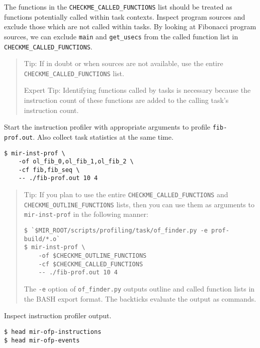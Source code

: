 \documentclass[11pt,a4paper]{article}
\begin{document}
The functions in the \texttt{CHECKME\_CALLED\_FUNCTIONS} list should be treated as functions potentially called within task contexts.  Inspect program sources and exclude those which are not called within tasks.  By looking at Fibonacci program sources, we can exclude \texttt{main} and \texttt{get\_usecs} from the called function list in \texttt{CHECKME\_CALLED\_FUNCTIONS}.

\begin{framed}
\begin{quote}
Tip: If in doubt or when sources are not available, use the entire \texttt{CHECKME\_CALLED\_FUNCTIONS} list.

Expert Tip: Identifying functions called by tasks is necessary because the instruction count of these functions are added to the calling task's instruction count.
\end{quote}
\end{framed}

Start the instruction profiler with appropriate arguments to profile \texttt{fib-prof.out}.  Also collect task statistics at the same time.

\begin{lstlisting}[style=MyInputStyle]
$ mir-inst-prof \
    -of ol_fib_0,ol_fib_1,ol_fib_2 \
    -cf fib,fib_seq \
    -- ./fib-prof.out 10 4
\end{lstlisting}

\begin{framed}
\begin{quote}
    Tip: If you plan to use the entire \texttt{CHECKME\_CALLED\_FUNCTIONS} and \texttt{CHECKME\_OUTLINE\_FUNCTIONS} lists, then you can use them as arguments to \texttt{mir-inst-prof} in the following manner:

\begin{lstlisting}[style=MyInputStyle]
$ `$MIR_ROOT/scripts/profiling/task/of_finder.py -e prof-build/*.o`
$ mir-inst-prof \
    -of $CHECKME_OUTLINE_FUNCTIONS
    -cf $CHECKME_CALLED_FUNCTIONS
    -- ./fib-prof.out 10 4
\end{lstlisting}

The \texttt{-e} option of \texttt{of\_finder.py} outputs outline and called function lists in the BASH export format. The backticks evaluate the output as commands.
\end{quote}
\end{framed}

Inspect instruction profiler output.

\begin{lstlisting}[style=MyInputStyle]
$ head mir-ofp-instructions
$ head mir-ofp-events
\end{lstlisting}
\end{document}
